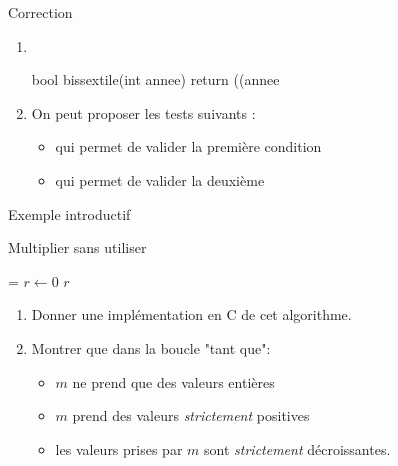 \documentclass[10pt,french]{beamer}
\begin{document}
\begin{frame}[fragile]{\Ctitle}{\stitle}
\begin{exampleblock}{Correction}
	\begin{enumerate}
	\item<1-> \ \\
	\begin{langageC}
bool bissextile(int annee) {
	return ((annee%
}
	\end{langageC}
	\item<2-> On peut proposer les tests suivants :
	\begin{itemize}
		\item<3->  qui permet de valider la première condition
		\item<4->  qui permet de valider la deuxième
	\end{itemize}
\end{enumerate}
\end{exampleblock}
\end{frame}

\begin{frame}[fragile]{\Ctitle}{\stitle}
	\begin{block}{Exemple introductif}
	\SetAlFnt{\small}
	\setlength{\algomargin}{8pt}
	\begin{algorithm}[H]
		\DontPrintSemicolon
		\caption{Multiplier sans utiliser {\tt *}}
		\everypar={\footnotesize \textcolor{gray}{\nl}}
		$r \leftarrow 0$\;
		\Return $r$
	  \end{algorithm}
	  \begin{enumerate}
	  \item<2-> Donner une implémentation en C de cet algorithme.
	  \item<3-> Montrer que dans la boucle "tant que":
	  \begin{itemize}
		\item<3-> $m$ ne prend que des valeurs entières
		\item<4-> $m$ prend des valeurs \textit{strictement} positives
		\item<5-> les valeurs prises par $m$ sont \textit{strictement} décroissantes.
	  \end{itemize}
	  \end{enumerate}
	\end{block}
\end{frame}
\end{document}
